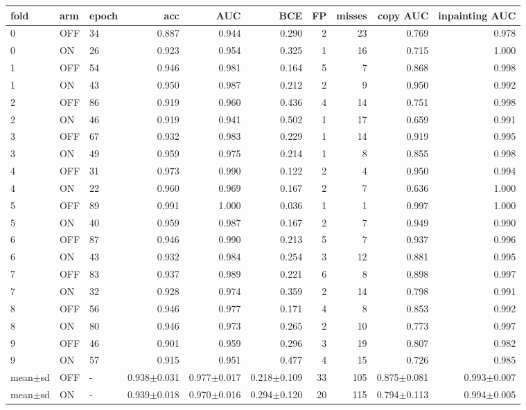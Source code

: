 \begin{tabular}{lllrrrrrrr}
\toprule
fold & arm & epoch & acc & AUC & BCE & FP & misses & copy AUC & inpainting AUC \\
\midrule
0 & OFF & 34 & 0.887 & 0.944 & 0.290 & 2 & 23 & 0.769 & 0.978 \\
0 & ON & 26 & 0.923 & 0.954 & 0.325 & 1 & 16 & 0.715 & 1.000 \\
1 & OFF & 54 & 0.946 & 0.981 & 0.164 & 5 & 7 & 0.868 & 0.998 \\
1 & ON & 43 & 0.950 & 0.987 & 0.212 & 2 & 9 & 0.950 & 0.992 \\
2 & OFF & 86 & 0.919 & 0.960 & 0.436 & 4 & 14 & 0.751 & 0.998 \\
2 & ON & 46 & 0.919 & 0.941 & 0.502 & 1 & 17 & 0.659 & 0.991 \\
3 & OFF & 67 & 0.932 & 0.983 & 0.229 & 1 & 14 & 0.919 & 0.995 \\
3 & ON & 49 & 0.959 & 0.975 & 0.214 & 1 & 8 & 0.855 & 0.998 \\
4 & OFF & 31 & 0.973 & 0.990 & 0.122 & 2 & 4 & 0.950 & 0.994 \\
4 & ON & 22 & 0.960 & 0.969 & 0.167 & 2 & 7 & 0.636 & 1.000 \\
5 & OFF & 89 & 0.991 & 1.000 & 0.036 & 1 & 1 & 0.997 & 1.000 \\
5 & ON & 40 & 0.959 & 0.987 & 0.167 & 2 & 7 & 0.949 & 0.990 \\
6 & OFF & 87 & 0.946 & 0.990 & 0.213 & 5 & 7 & 0.937 & 0.996 \\
6 & ON & 43 & 0.932 & 0.984 & 0.254 & 3 & 12 & 0.881 & 0.995 \\
7 & OFF & 83 & 0.937 & 0.989 & 0.221 & 6 & 8 & 0.898 & 0.997 \\
7 & ON & 32 & 0.928 & 0.974 & 0.359 & 2 & 14 & 0.798 & 0.991 \\
8 & OFF & 56 & 0.946 & 0.977 & 0.171 & 4 & 8 & 0.853 & 0.992 \\
8 & ON & 80 & 0.946 & 0.973 & 0.265 & 2 & 10 & 0.773 & 0.997 \\
9 & OFF & 46 & 0.901 & 0.959 & 0.296 & 3 & 19 & 0.807 & 0.982 \\
9 & ON & 57 & 0.915 & 0.951 & 0.477 & 4 & 15 & 0.726 & 0.985 \\
mean$\pm$sd & OFF & - & 0.938$\pm$0.031 & 0.977$\pm$0.017 & 0.218$\pm$0.109 & 33 & 105 & 0.875$\pm$0.081 & 0.993$\pm$0.007 \\
mean$\pm$sd & ON & - & 0.939$\pm$0.018 & 0.970$\pm$0.016 & 0.294$\pm$0.120 & 20 & 115 & 0.794$\pm$0.113 & 0.994$\pm$0.005 \\
\bottomrule
\end{tabular}

